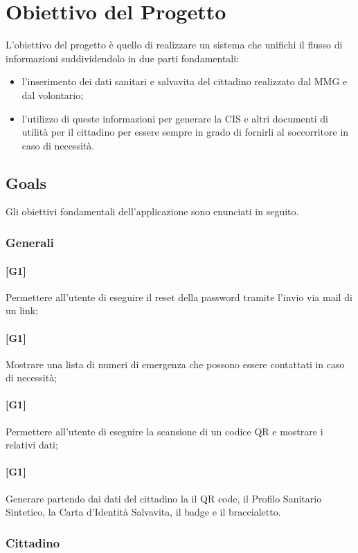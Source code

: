 \documentclass[12pt,a4paper,twoside,openright,titlepage]{book}
\begin{document}
\section{Obiettivo del Progetto}
L'obiettivo del progetto è quello di realizzare un sistema che unifichi il flusso di informazioni suddividendolo in due parti fondamentali:
\begin{itemize}
\item l'inserimento dei dati sanitari e salvavita del cittadino realizzato dal MMG e dal volontario;
\item l'utilizzo di queste informazioni per generare la CIS e altri documenti di utilità per il cittadino per essere sempre in grado di fornirli al soccorritore in caso di necessità.
\end{itemize}

\subsection{Goals}
Gli obiettivi fondamentali dell'applicazione sono enunciati in seguito.

\subsubsection{Generali}
\paragraph{[G1]} Permettere all'utente di eseguire il reset della password tramite l'invio via mail di un link;
\paragraph{[G1]} Mostrare una lista di numeri di emergenza che possono essere contattati in caso di necessità;
\paragraph{[G1]} Permettere all'utente di eseguire la scansione di un codice QR e mostrare i relativi dati;
\paragraph{[G1]} Generare partendo dai dati del cittadino la il QR code, il Profilo Sanitario Sintetico, la Carta d'Identità Salvavita, il badge e il braccialetto.

\subsubsection{Cittadino}
\end{document}
